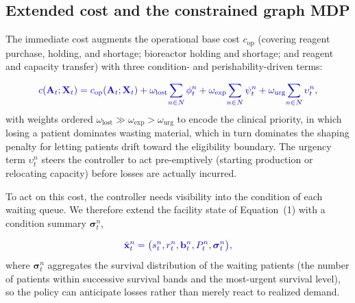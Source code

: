\documentclass[preprint,review,12pt,nonatbib]{elsarticle}
\providecommand{\DIFadd}[1]{{\protect\color{blue}#1}} %
\begin{document}
\subsection{\DIFadd{Extended cost and the constrained graph MDP}}
\label{sec:problem-graph-mdp}

\DIFadd{The immediate cost augments the operational base cost $c_{\mathrm{op}}$ (covering reagent purchase, holding, and shortage; bioreactor holding and shortage; and reagent and capacity transfer) with three condition- and perishability-driven terms:
}

\begin{equation}
\DIFadd{\label{eq:cost}
c(\mathbf{A}_t;\mathbf{X}_t) = c_{\mathrm{op}}(\mathbf{A}_t;\mathbf{X}_t)
+ \omega_{\mathrm{lost}}\!\sum_{n\in N}\phi^n_t
+ \omega_{\mathrm{exp}}\!\sum_{n\in N}\psi^n_t
+ \omega_{\mathrm{urg}}\!\sum_{n\in N}\upsilon^n_t,
}\end{equation}
\DIFadd{with weights ordered $\omega_{\mathrm{lost}} \gg \omega_{\mathrm{exp}} > \omega_{\mathrm{urg}}$ to encode the clinical priority, in which losing a patient dominates wasting material, which in turn dominates the shaping penalty for letting patients drift toward the eligibility boundary. The urgency term $\upsilon^n_t$ steers the controller to act pre-emptively (starting production or relocating capacity) before losses are actually incurred.
}

\DIFadd{To act on this cost, the controller needs visibility into the condition of each waiting queue. We therefore extend the facility state of Equation~(1) with a condition summary $\boldsymbol{\sigma}^n_t$,
}

\begin{equation}
\DIFadd{\label{eq:extended-state}
\tilde{\mathbf{x}}^n_t = \big(s^n_t, r^n_t, \mathbf{b}^n_t, P^n_t, \boldsymbol{\sigma}^n_t\big),
}\end{equation}
\DIFadd{where $\boldsymbol{\sigma}^n_t$ aggregates the survival distribution of the waiting patients (the number of patients within successive survival bands and the most-urgent survival level), so the policy can anticipate losses rather than merely react to realized demand.
}
\end{document}
